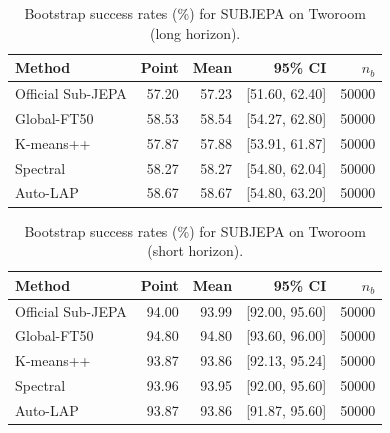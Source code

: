 \begin{table}[t]
\centering
\small
\caption{Bootstrap success rates (\%) for SUBJEPA on Tworoom (long horizon).}
\begin{tabular}{lrrrr}
\toprule
Method & Point & Mean & 95\% CI & $n_b$ \\
\midrule
Official Sub-JEPA & 57.20 & 57.23 & [51.60, 62.40] & 50000 \\
Global-FT50 & 58.53 & 58.54 & [54.27, 62.80] & 50000 \\
K-means++ & 57.87 & 57.88 & [53.91, 61.87] & 50000 \\
Spectral & 58.27 & 58.27 & [54.80, 62.04] & 50000 \\
Auto-LAP & 58.67 & 58.67 & [54.80, 63.20] & 50000 \\
\bottomrule
\end{tabular}
\end{table}

\begin{table}[t]
\centering
\small
\caption{Bootstrap success rates (\%) for SUBJEPA on Tworoom (short horizon).}
\begin{tabular}{lrrrr}
\toprule
Method & Point & Mean & 95\% CI & $n_b$ \\
\midrule
Official Sub-JEPA & 94.00 & 93.99 & [92.00, 95.60] & 50000 \\
Global-FT50 & 94.80 & 94.80 & [93.60, 96.00] & 50000 \\
K-means++ & 93.87 & 93.86 & [92.13, 95.24] & 50000 \\
Spectral & 93.96 & 93.95 & [92.00, 95.60] & 50000 \\
Auto-LAP & 93.87 & 93.86 & [91.87, 95.60] & 50000 \\
\bottomrule
\end{tabular}
\end{table}
